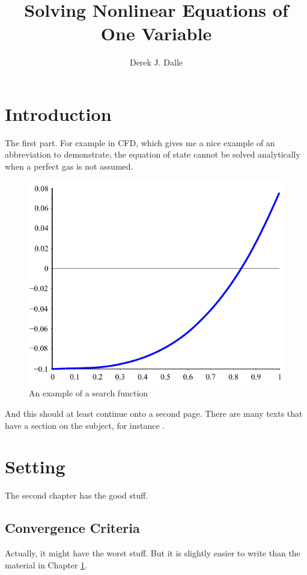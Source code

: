 \documentclass[thesis]{./tex/thesis-umich}
\title{Solving Nonlinear Equations of One Variable}
\author{Derek J. Dalle}
\begin{document}
\chapter{Introduction}   \label{chap:intro}
The first part.  For example in \ac{CFD}, which gives me a nice
example of an abbreviation to demonstrate, the equation of state
cannot be solved analytically when a perfect gas is not assumed.

\begin{figure}
 \begin{center}
  \includegraphics[scale=1]{./pics/f1_plain.pdf}
 \end{center}
 \caption{ \label{fig:fn:1}
  An example of a search function}
\end{figure}

\newpage

And this should at least continue onto a second page.  There are many texts that have a section on the subject, for instance \cite{chapra:2002:numerics}.

\chapter{Setting}
The second chapter has the good stuff.

\section{Convergence Criteria}
Actually, it might have the worst stuff.  But it is slightly easier to write than the material in Chapter \ref{chap:intro}.
\end{document}
